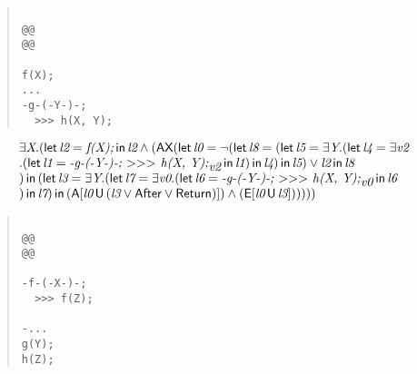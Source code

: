 \documentclass{article}
\newcommand{\U}{\,\mbox{\sf{U}}\,}
\newcommand{\A}{\mbox{\sf{A}}}
\newcommand{\E}{\mbox{\sf{E}}}
\newcommand{\AX}{\mbox{\sf{AX}}}
\newcommand{\mita}[1]{\mbox{\it{{#1}}}}
\newcommand{\msf}[1]{\mbox{\sf{{#1}}}}
\newcommand{\mth}[1]{\({#1}\)}
\begin{document}
\begin{quote}\begin{verbatim}

@@
@@

f(X);
...
-g-(-Y-)-;
  >>> h(X, Y);

\end{verbatim}\end{quote}

\[\begin{array}{l}
\exists \mita{X} . (\mita{\sf{let}} \, \mita{l2} = \mita{f(X);} \, \mita{\sf{in}} \, \mita{l2} \wedge (\AX(\mita{\sf{let}} \, \mita{l0} = \neg (\mita{\sf{let}} \, \mita{l8} = (\mita{\sf{let}} \, \mita{l5} = \exists \mita{Y} . (\mita{\sf{let}} \, \mita{l4} = \exists \mita{v2}\\\mbox{} . (\mita{\sf{let}} \, \mita{l1} = \mita{-g-(-Y-)-;
  \mth{>}\mth{>}\mth{>} h(X, Y);}_{\mita{v2}} \, \mita{\sf{in}} \, \mita{l1}
) \, \mita{\sf{in}} \, \mita{l4}
) \, \mita{\sf{in}} \, \mita{l5}
) \vee \mita{l2} \, \mita{\sf{in}} \, \mita{l8}\\\mbox{}
) \, \mita{\sf{in}} \, (\mita{\sf{let}} \, \mita{l3} = \exists \mita{Y} . (\mita{\sf{let}} \, \mita{l7} = \exists \mita{v0} . (\mita{\sf{let}} \, \mita{l6} = \mita{-g-(-Y-)-;
  \mth{>}\mth{>}\mth{>} h(X, Y);}_{\mita{v0}} \, \mita{\sf{in}} \, \mita{l6}\\\mbox{}
) \, \mita{\sf{in}} \, \mita{l7}
) \, \mita{\sf{in}} \, (\A[\mita{l0} \U (\mita{l3} \vee \msf{After} \vee \msf{Return})]
) \wedge (\E[\mita{l0} \U \mita{l3}]
)
)
))
)
\end{array}\]

\begin{quote}\begin{verbatim}

@@
@@

-f-(-X-)-;
  >>> f(Z);

-...
g(Y);
h(Z);
\end{verbatim}\end{quote}
\end{document}
